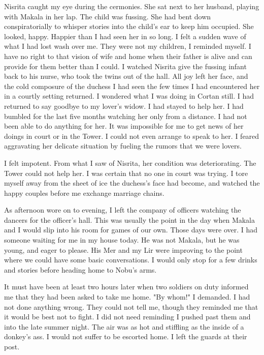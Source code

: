 \documentclass{article}
\begin{document}
Nisrita caught my eye during the cermonies. She sat next to her husband, playing with Makala in her lap. The child was fussing. She had bent down conspiratorially to whisper stories into the child's ear to keep him occupied. She looked, happy. Happier than I had seen her in so long. I felt a sudden wave of what I had lost wash over me. They were not my children, I reminded myself. I have no right to that vision of wife and home when their father is alive and can provide for them better than I could. I watched Nisrita give the fussing infant back to his nurse, who took the twins out of the hall. All joy left her face, and the cold composure of the duchess I had seen the few times I had encountered her in a courtly setting returned. I wondered what I was doing in Cortan still. I had returned to say goodbye to my lover's widow. I had stayed to help her. I had bumbled for the last five months watching her only from a distance. I had not been able to do anything for her. It was impossible for me to get news of her doings in court or in the Tower. I could not even arrange to speak to her. I feared aggravating her delicate situation by fueling the rumors that we were lovers. 

I felt impotent. From what I saw of Nisrita, her condition was deteriorating. The Tower could not help her. I was certain that no one in court was trying. I tore myself away from the sheet of ice the duchess's face had become, and watched the happy couples before me exchange marriage chains.

As afternoon wore on to evening, I left the company of officers watching the dancers for the officer's hall. This was usually the point in the day when Makala and I would slip into his room for games of our own. Those days were over. I had someone waiting for me in my house today. He was not Makala, but he was young, and eager to please. His Mer and my Lir were improving to the point where we could have some basic conversations. I would only stop for a few drinks and stories before heading home to Nobu's arms. 

It must have been at least two hours later when two soldiers on duty informed me that they had been asked to take me home. "By whom!" I demanded. I had not done anything wrong. They could not tell me, though they reminded me that it would be best not to fight. I did not need reminding I pushed past them and into the late summer night. The air was as hot and stiffling as the inside of a donkey's ass. I would not suffer to be escorted home. I left the guards at their post.
\end{document}
